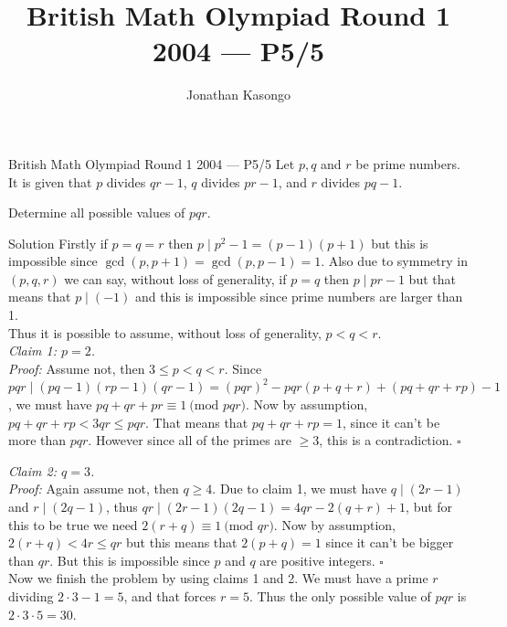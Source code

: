 \documentclass{article}
\author{Jonathan Kasongo}
\title{British Math Olympiad Round 1 2004 --- P5/5}
\begin{document}
\maketitle

\begin{problem}{British Math Olympiad Round 1 2004 --- P5/5}
Let $p, q$ and $r$ be prime numbers. It is given that $p$ divides $qr - 1$,
$q$ divides $pr - 1$, and $r$ divides $pq - 1$.

Determine all possible values of $pqr$.
\end{problem}

\begin{solution}{Solution}
Firstly if $p = q = r$ then $p \mid p^2 - 1 = (p - 1)(p + 1)$ but this
is impossible since $\gcd(p, p+1) = \gcd(p, p-1) = 1$. Also due to
symmetry in $(p, q, r)$ we can say, without loss
of generality, if $p = q$ then $p \mid pr - 1$ but that means that
$p \mid (-1)$ and this is impossible since prime numbers are larger than 1.
\\

Thus it is possible to assume, without loss of generality, $p < q < r$.\\

\textit{Claim 1: $p = 2$.}\\

\textit{Proof:} Assume not, then $3 \leq p < q < r$. Since
$pqr \mid (pq-1)(rp-1)(qr-1) = (pqr)^2 - pqr(p+q+r) + (pq+qr+rp) - 1$, we
must have $pq + qr + pr \equiv 1 \ \text{(mod } pqr)$. Now by assumption,
$pq + qr + rp < 3qr \leq pqr$. That means that $pq + qr + rp = 1$, since
it can't be more than $pqr$. However since all of the primes are $\geq 3$,
this is a contradiction. $\square$
\vspace{\baselineskip}

\textit{Claim 2: $q = 3$.}\\

\textit{Proof:} Again assume not, then $q \geq 4$. Due to claim 1, we must
have $q \mid (2r-1)$ and $r \mid (2q - 1)$, thus
$qr \mid (2r-1)(2q-1) = 4qr - 2(q + r) + 1$, but for this to be true we
need $2(r + q) \equiv 1 \ \text{(mod } qr)$. Now by assumption,
$2(r + q) < 4r \leq qr$ but this means that $2(p + q) = 1$ since it can't
be bigger than $qr$. But this is impossible since $p$ and $q$ are positive
integers. $\square$
\\

Now we finish the problem by using claims 1 and 2. We must have a prime
$r$ dividing $2 \cdot 3 - 1 = 5$, and that forces $r = 5$.
Thus the only possible value of $pqr$ is $2 \cdot 3 \cdot 5 = 30$.
\blacksquare
\end{solution}
\end{document}
